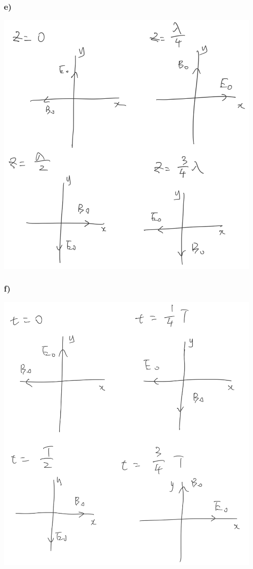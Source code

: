 \documentclass[../homework.tex]{subfiles}
\begin{document}
\subsubsection*{e)}
\includegraphics[width=.65\columnwidth]{p2-e.jpg}

\subsubsection*{f)}
\includegraphics[width=.65\columnwidth]{p2-f.jpg}
\end{document}
